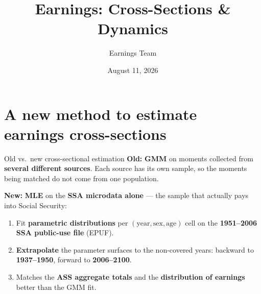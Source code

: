 \documentclass[10pt,aspectratio=169]{beamer}
\title{Earnings: Cross-Sections \& Dynamics}
\subtitle{Earnings Team}
\date{August 11, 2026}
\begin{document}
\maketitle

\section{A new method to estimate earnings cross-sections}

\begin{frame}{Old vs.\ new cross-sectional estimation}
  \textbf{Old:} \textbf{GMM} on moments collected from \textbf{several different sources}.
  Each source has its own sample, so the moments being matched do not come from one population.

  \medskip
  \textbf{New:} \textbf{MLE} on the \textbf{SSA microdata alone} --- the sample that actually
  pays into Social Security:
  \begin{enumerate}
    \item Fit \textbf{parametric distributions} per $(\text{year},\text{sex},\text{age})$ cell
          on the \textbf{1951--2006 SSA public-use file} (EPUF).
    \item \textbf{Extrapolate} the parameter surfaces to the non-covered years:
          backward to \textbf{1937--1950}, forward to \textbf{2006--2100}.
    \item Matches the \textbf{ASS aggregate totals} and the \textbf{distribution of earnings}
          better than the GMM fit.
  \end{enumerate}
  \vfill
  \begin{center}
  \end{center}
\end{frame}
\end{document}
